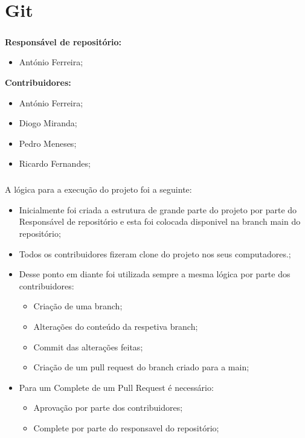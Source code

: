 \chapter*{\thechapter \quad Git}
\paragraph{}

\textbf{Responsável de repositório:}
\begin{itemize}
   \item António Ferreira;
\end{itemize}

\textbf{Contribuidores:}
\begin{itemize}
   \item António Ferreira; 
   \item Diogo Miranda; 
   \item Pedro Meneses; 
   \item Ricardo Fernandes; 
\end{itemize}

\paragraph{}
A lógica para a execução do projeto foi a seguinte:
\begin{itemize}
    \item Inicialmente foi criada a estrutura de grande parte do projeto por parte do Responsável de repositório e esta foi colocada disponivel na branch main do repositório;
    \item Todos os contribuidores fizeram clone do projeto nos seus computadores.;
    \item Desse ponto em diante foi utilizada sempre a mesma lógica por parte dos contribuidores:
    \begin{itemize}
    \item Criação de uma branch;
    \item Alterações do conteúdo da respetiva branch;
    \item Commit das alterações feitas;
    \item Criação de um pull request do branch criado para a main;
    \end{itemize}
    
    \item Para um Complete de um Pull Request é necessário:
    \begin{itemize}
    \item Aprovação por parte dos contribuidores;
    \item Complete por parte do responsavel do repositório;
    \end{itemize}
\end{itemize}
